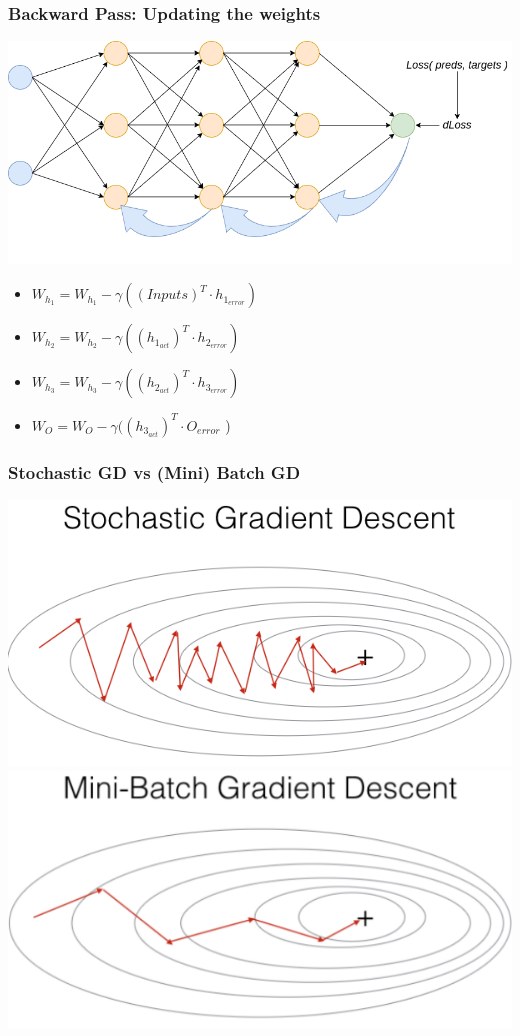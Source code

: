 \begin{frame}
    \frametitle{Backward Pass: Updating the weights}
    \center\includegraphics[width=.8\textwidth]{Images/backprop.png}
    \begin{itemize}
        \item $W_{h_1} = W_{h_1} - \gamma ((Inputs)^T \cdot h_{1_{error}})$
        \item $W_{h_2} = W_{h_2} - \gamma ((h_{1_{act}})^T \cdot h_{2_{error}})$
        \item $W_{h_3} = W_{h_3} - \gamma ((h_{2_{act}})^T \cdot h_{3_{error}})$
        \item $W_{O} = W_{O} - \gamma ((h_{3_{act}})^T \cdot O_{error}$ )
    \end{itemize}
\end{frame}

\begin{frame}
    \frametitle{Stochastic GD vs (Mini) Batch GD}
    \center\includegraphics[width=.55\textwidth]{Images/sgd.png}
    \center\includegraphics[width=.55\textwidth]{Images/bgd.png}

\end{frame}

